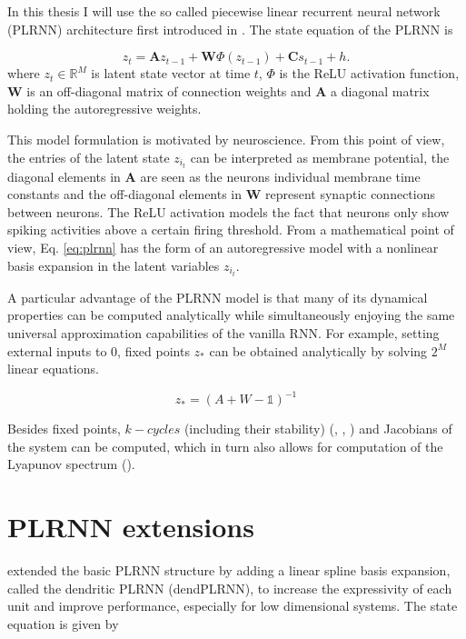 In this thesis I will use the so called piecewise linear recurrent neural network (PLRNN) architecture first introduced in \cite{durstewitz2017state}.
The state equation of the PLRNN is 

\begin{equation}
    z_{t} = \boldsymbol{A} z_{t-1} + \boldsymbol{W} \Phi (z_{t-1}) + \boldsymbol{C} s_{t-1} + h.
    \label{eq:plrnn}
\end{equation}
where $z_t \in \mathbb{R}^M$ is latent state vector at time $t$, $\Phi$ is the ReLU activation function, $\boldsymbol{W}$ is an off-diagonal
matrix of connection weights and $\boldsymbol{A}$ a diagonal matrix holding the autoregressive weights.

This model formulation is motivated by neuroscience. From this point of view, the entries of the latent state $z_{i_t}$ can be interpreted as membrane
potential, the diagonal elements in $\boldsymbol{A}$ are seen as the neurons individual membrane time constants and the off-diagonal elements in 
$\boldsymbol{W}$ represent synaptic connections between neurons. The ReLU activation models the fact that neurons only show spiking activities
above a certain firing threshold. From a mathematical point of view, Eq. \ref{eq:plrnn}  has the form of an autoregressive model with a nonlinear
basis expansion in the latent variables $z_{i_t}$. 

A particular advantage of the PLRNN model is that many of its dynamical properties can be computed analytically while simultaneously enjoying the same universal 
approximation capabilities of the vanilla RNN. For example, setting external inputs to $0$, fixed points $z_{\ast}$ can be obtained analytically 
by solving $2^M$ linear equations. 

\begin{equation}
    z_{\ast} = (A + W - \mathbb{1})^{-1} 
\end{equation}

Besides fixed points, $k-cycles$ (including their stability) (\cite{koppe2019identifying}, \cite{schmidt2019identifying}, \cite{brenner2022tractable})
and Jacobians of the system can be computed, which in turn also allows for computation of the Lyapunov spectrum (\cite{mikhaeil2022difficulty}).

\section{PLRNN extensions}

\cite{brenner2022tractable} extended the basic PLRNN structure by adding a linear spline basis expansion, called the dendritic PLRNN (dendPLRNN), to increase the expressivity
of each unit and improve performance, especially for low dimensional systems. The state equation is given by 

